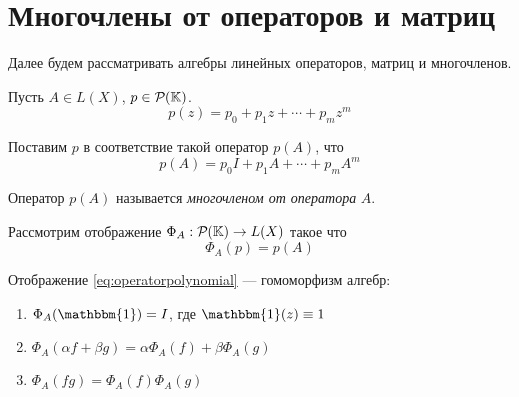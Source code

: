 \section{Многочлены от операторов и матриц}
Далее будем рассматривать алгебры линейных операторов, матриц и
многочленов.

Пусть $A \in L(X)$, $p \in \mathcal{P}_{}({\mathbb{K}})$.
\[ p(z) = p_0 + p_1 z + \dotsb + p_m z^m \]

Поставим $p$ в соответствие такой оператор $p(A)$, что
\[ p(A) = p_0 I + p_1 A + \dotsb + p_m A^m \]

\begin{definition}
    Оператор $p(A)$ называется \emph{многочленом от оператора} $A$.
\end{definition}

Рассмотрим отображение $ \Phi_A : \mathcal{P}_{}({\mathbb{K}}) \to L(X) $ такое что
\begin{equation}\label{eq:operatorpolynomial}
    \Phi_A(p) = p(A) 
\end{equation}

\begin{lemma}
    Отображение \eqref{eq:operatorpolynomial} — гомоморфизм алгебр:
    \begin{enumerate}
        \item $\Phi_A(\mathbbm{1}) = I$, где $\mathbbm{1}(z) \equiv 1$
        \item $\Phi_A(\alpha f + \beta g) = \alpha \Phi_A(f) + \beta \Phi_A(g)$
        \item $\Phi_A(fg) = \Phi_A(f) \Phi_A(g)$
    \end{enumerate}
\end{lemma}

